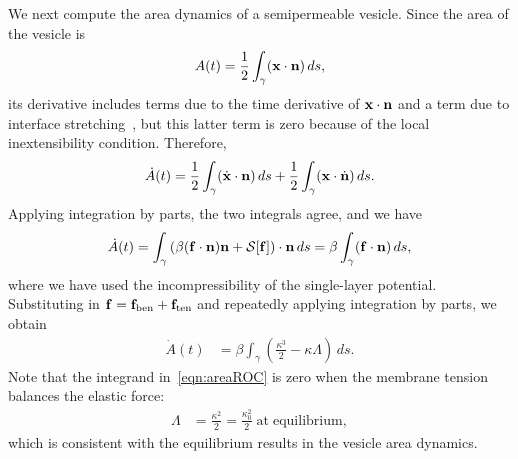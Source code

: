 \documentclass[prb,preprint,showpacs,preprintnumbers,amsmath,amssymb,longbibliography]{revtex4-1}
\begin{document}
We next compute the area dynamics of a semipermeable vesicle. Since the area of the
vesicle is
\begin{align}
  A(t) = \frac{1}{2}\int_{\gamma} (\mathbf{x} \cdot \mathbf{n})\, ds,
  \label{eqn:area}
\end{align}
its derivative includes terms due to the time derivative of $\mathbf{x} \cdot
\mathbf{n}$ and a term due to interface stretching~\cite{lai-tse-hua2008}, but
this latter term is zero because of the local inextensibility condition.
Therefore,
\begin{align}
  \dot{A}(t) =
  \frac{1}{2} \int_{\gamma} (\dot{\mathbf{x}} \cdot \mathbf{n})\, ds  + 
  \frac{1}{2} \int_{\gamma} (\mathbf{x} \cdot \dot{\mathbf{n}})\, ds.
\end{align}
Applying integration by parts, the two integrals agree, and we have
\begin{align}
  \dot{A}(t) = \int_\gamma \left(\beta (\mathbf{f} \cdot \mathbf{n})\mathbf{n} 
    + \mathcal{S}[\mathbf{f}]\right) \cdot \mathbf{n}\, ds 
  = \beta \int_\gamma (\mathbf{f} \cdot \mathbf{n})\, ds,
\end{align}
where we have used the incompressibility of the single-layer potential.
Substituting in $\mathbf{f} = \mathbf{f}_\mathrm{ben} + \mathbf{f}_\mathrm{ten}$ and
repeatedly applying integration by parts, we obtain
\begin{align}
  \dot{A}(t) & = \beta \int_\gamma \left(
    \frac{\kappa^3}{2} - \kappa \Lambda \right) \, ds.
  \label{eqn:areaROC}
\end{align}
Note that the integrand in~\eqref{eqn:areaROC} is zero when the membrane tension balances the elastic force:
\begin{align}
\label{eqn:areaROC2}
\Lambda &= \frac{\kappa^2}{2}=\frac{\kappa_0^2}{2} \;\mathrm{ at }\; \mathrm{equilibrium},
\end{align}
which is consistent with the equilibrium results in the vesicle area dynamics.
\end{document}
